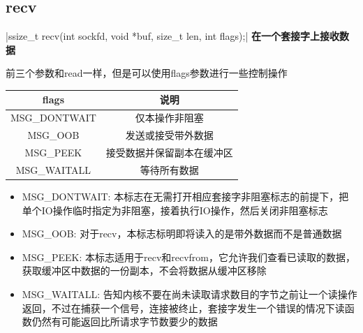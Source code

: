 \subsection{recv}
|ssize_t recv(int sockfd, void *buf, size_t len, int flags);|
\noindent \textbf{在一个套接字上接收数据}
\begin{spacing}{2.0}
前三个参数和read一样，但是可以使用flags参数进行一些控制操作
\end{spacing}
\begin{table}[!htb]
\centering
	\begin{tabular}{|c|c|}
	\hline
	flags & 说明 \\
	\hline
		MSG\_DONTWAIT & 仅本操作非阻塞 \\
	\hline
		MSG\_OOB & 发送或接受带外数据 \\
	\hline	
		MSG\_PEEK & 接受数据并保留副本在缓冲区 \\
	\hline		
		MSG\_WAITALL & 等待所有数据 \\
	\hline
	\end{tabular}
\end{table}
\begin{itemize}
	\item MSG\_DONTWAIT: 本标志在无需打开相应套接字非阻塞标志的前提下，把单个IO操作临时指定为非阻塞，接着执行IO操作，然后关闭非阻塞标志
	\item MSG\_OOB: 对于recv，本标志标明即将读入的是带外数据而不是普通数据
	\item MSG\_PEEK: 本标志适用于recv和recvfrom，它允许我们查看已读取的数据，获取缓冲区中数据的一份副本，不会将数据从缓冲区移除
	\item MSG\_WAITALL: 告知内核不要在尚未读取请求数目的字节之前让一个读操作返回，不过在捕获一个信号，连接被终止，套接字发生一个错误的情况下读函数仍然有可能返回比所请求字节数要少的数据
\end{itemize}
\newpage

